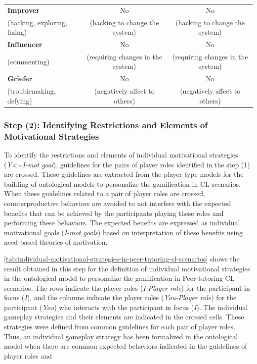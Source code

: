 {\begin{longtable}{lcc}
\textbf{Improver}&No&No\tabularnewline
{\footnotesize(hacking, exploring, fixing)}&{\footnotesize(hacking to change the system)}&{\footnotesize(hacking to change the system)}\tabularnewline
\hline

\textbf{Influencer}&No&No \tabularnewline
{\footnotesize(commenting)}&{\footnotesize(requiring changes in the system)}&{\footnotesize(requiring changes in the system)} \tabularnewline
\hline

\textbf{Griefer}&No&No\tabularnewline
{\footnotesize(troublemaking, defying)}&{\footnotesize(negatively affect to others)}&{\footnotesize(negatively affect to others)}\tabularnewline

\hline
\end{longtable}
}

\subsubsection*{Step (2): Identifying Restrictions and Elements of Motivational Strategies}

To identify the restrictions and elements of individual motivational strategies (\emph{Y<=I-mot goal}), guidelines for the pairs of player roles identified in the step (1) are crossed. These guidelines are extracted from the player type models for the building of ontological models to personalize the gamification in CL scenarios. When these guidelines related to a pair of player roles are crossed, counterproductive behaviors are avoided to not interfere with the expected benefits that can be achieved by the participants playing these roles and performing these behaviors. The expected benefits are expressed as individual motivational goals (\emph{I-mot goals}) based on interpretation of these benefits using need-based theories of motivation. 

\autoref{tab:individual-motivational-strategies-in-peer-tutoring-cl-scenarios} shows the result obtained in this step for the definition of individual motivational strategies in the ontological model to personalize the gamification in Peer-tutoring CL scenarios. The rows indicate the player roles (\emph{I-Player role}) for the participant in focus (\emph{I}), and the columns indicate the player roles (\emph{You-Player role}) for the participant (\emph{You}) who interacts with the participant in focus (\emph{I}). The individual gameplay strategies and their elements are indicated in the crossed cells. These strategies were defined from common guidelines for each pair of player roles. Thus, an individual gameplay strategy has been formalized in the ontological model when there are common expected behaviors indicated in the guidelines of player roles  and 
 

